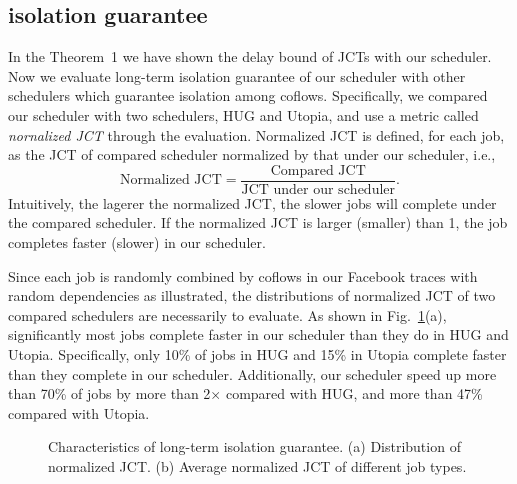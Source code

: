 \documentclass[10pt, conference, letterpaper]{IEEEtran}
\begin{document}
\subsection{isolation guarantee}
In the Theorem~1 we have shown the delay bound of JCTs with our scheduler. Now we evaluate long-term isolation guarantee of our scheduler with other schedulers which guarantee isolation among coflows. Specifically, we compared our scheduler with two schedulers, HUG and Utopia, and use a metric called \emph{nornalized JCT} through the evaluation. Normalized JCT is defined, for each job, as the JCT of compared scheduler normalized by that under our scheduler, i.e.,
\[\text{Normalized JCT} = \frac{\text{Compared JCT}}{\text{JCT under our scheduler}}.\]
Intuitively, the lagerer the normalized JCT, the slower jobs will complete under the compared scheduler. If the normalized JCT is larger (smaller) than 1, the job completes faster (slower) in our scheduler.

Since each job is randomly combined by coflows in our Facebook traces with random dependencies as illustrated, the distributions of normalized JCT of two compared schedulers are necessarily to evaluate. As shown in Fig.~\ref{f1}(a), significantly most jobs complete faster in our scheduler than they do in HUG and Utopia. Specifically, only 10\% of jobs in HUG and 15\% in Utopia complete faster than they complete in our scheduler. Additionally, our scheduler speed up more than 70\% of jobs by more than 2$\times$ compared with HUG, and more than 47\% compared with Utopia.

\begin{figure}[!t]
	\centering
	\hfil
	\caption{Characteristics of long-term isolation guarantee. (a) Distribution of normalized JCT. (b) Average normalized JCT of different job types.}
	\label{f1}
\end{figure}
\end{document}
